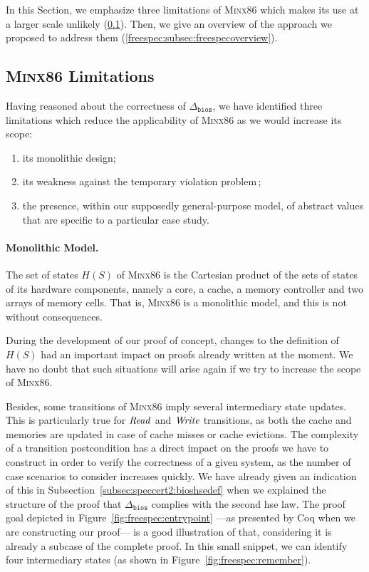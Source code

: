 In this Section, we emphasize three limitations of {\scshape Minx86} which makes
its use at a larger scale unlikely (\ref{subsec:freespec:minx86lim}).
%
Then, we give an overview of the approach we proposed to address them
(\ref{freespec:subsec:freespecoverview}).

\subsection{{\scshape Minx86} Limitations}
\label{subsec:freespec:minx86lim}

Having reasoned about the correctness of \( \Delta_{\mathtt{bios}} \), we have
identified three limitations which reduce the applicability of {\scshape Minx86}
as we would increase its scope:
\begin{enumerate}
\item its monolithic design;
\item its weakness against the temporary violation
  problem\,\cite{muller2006tempviolation};
\item the presence, within our supposedly general-purpose model, of abstract
  values that are specific to a particular case study.
\end{enumerate}

\paragraph{Monolithic Model.}
%
The set of states \( H(S) \) of {\scshape Minx86} is the Cartesian product of
the sets of states of its hardware components, namely a core, a cache, a memory
controller and two arrays of memory cells.
%
That is, {\scshape Minx86} is a monolithic model, and this is not without
consequences.

During the development of our proof of concept, changes to the definition of
\( H(S) \) had an important impact on proofs already written at the moment.
%
We have no doubt that such situations will arise again if we try to increase the
scope of {\scshape Minx86}.

Besides, some transitions of {\scshape Minx86} imply several intermediary state
updates.
%
This is particularly true for \( \mathit{Read} \) and \( \mathit{Write} \)
transitions, as both the cache and memories are updated in case of cache misses
or cache evictions.
%
The complexity of a transition postcondition has a direct impact on the proofs
we have to construct in order to verify the correctness of a given system, as
the number of case scenarios to consider increases quickly.
%
We have already given an indication of this in
Subsection~\ref{subsec:speccert2:bioshsedef} when we explained the structure of
the proof that \( \Delta_{\mathtt{bios}} \) complies with the second \ac{hse}
law.
%
The proof goal depicted in Figure~\ref{fig:freespec:entrypoint} ---as presented
by Coq when we are constructing our proof--- is a good illustration of that,
considering it is already a subcase of the complete proof.
%
In this small snippet, we can identify four intermediary states (as shown in
Figure~\ref{fig:freespec:remember}).

